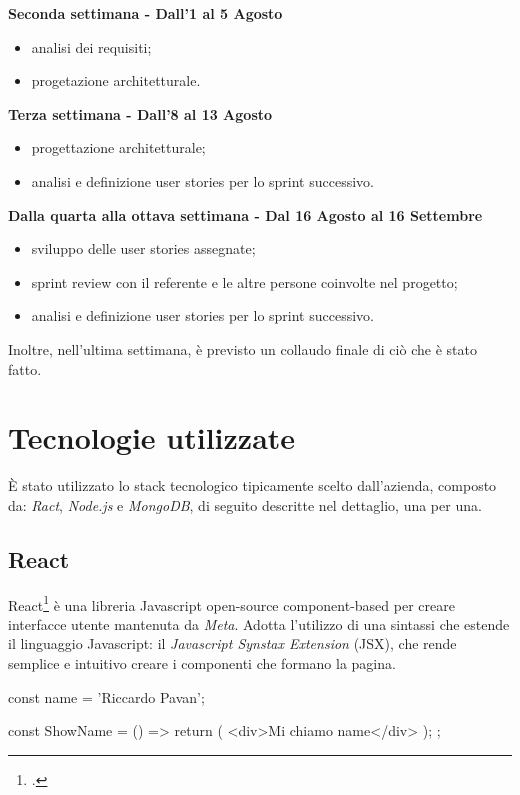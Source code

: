 \noindent\textbf{Seconda settimana - Dall'1 al 5 Agosto}

\begin{itemize}
  \item analisi dei requisiti;
  \item progetazione architetturale.
\end{itemize}

\noindent\textbf{Terza settimana - Dall'8 al 13 Agosto}

\begin{itemize}
  \item progettazione architetturale;
  \item analisi e definizione user stories per lo sprint successivo.
\end{itemize}

\noindent\textbf{Dalla quarta alla ottava settimana - Dal 16 Agosto al 16 Settembre}

\begin{itemize}
  \item sviluppo delle user stories assegnate;
  \item sprint review con il referente e le altre persone coinvolte nel progetto;
  \item analisi e definizione user stories per lo sprint successivo.
\end{itemize}

\noindent Inoltre, nell'ultima settimana, è previsto un collaudo finale di ciò che è stato fatto.

\section{Tecnologie utilizzate}

È stato utilizzato lo stack tecnologico tipicamente scelto dall'azienda, composto da: \emph{Ract}, \emph{Node.js} e \emph{MongoDB}, di seguito descritte nel dettaglio, una per una.

\subsection{React}

React\footcite{site:react} è una libreria Javascript open-source component-based per creare interfacce utente mantenuta da \emph{Meta}. Adotta l'utilizzo di una sintassi che estende il linguaggio Javascript: il \emph{Javascript Synstax Extension} (JSX), che rende semplice e intuitivo creare i componenti che formano la pagina.\\
\begin{code}[frame=tb,title={Esempio di utlizzo di codice JSX}]
  const name = 'Riccardo Pavan';

  const ShowName = () => {
    return (
      <div>Mi chiamo {name}</div>
    );
  };

\end{code}

